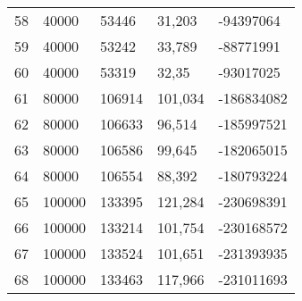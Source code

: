 \begin{longtable}{lllll}
    58               & 40000          & 53446          & 31,203      & -94397064       \\
    59               & 40000          & 53242          & 33,789      & -88771991       \\
    60               & 40000          & 53319          & 32,35       & -93017025       \\
    61               & 80000          & 106914         & 101,034     & -186834082      \\
    62               & 80000          & 106633         & 96,514      & -185997521      \\
    63               & 80000          & 106586         & 99,645      & -182065015      \\
    64               & 80000          & 106554         & 88,392      & -180793224      \\
    65               & 100000         & 133395         & 121,284     & -230698391      \\
    66               & 100000         & 133214         & 101,754     & -230168572      \\
    67               & 100000         & 133524         & 101,651     & -231393935      \\
    68               & 100000         & 133463         & 117,966     & -231011693      
\end{longtable}
